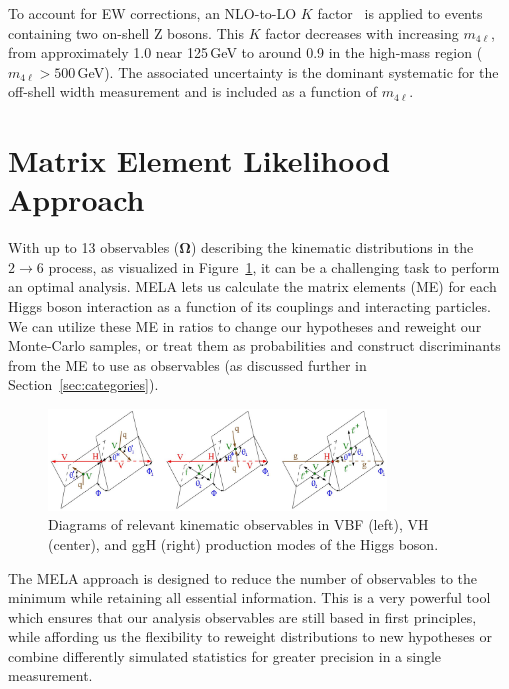 To account for EW corrections, an NLO-to-LO $K$ factor~\cite{Bierweiler:2013dja} is applied to events containing two on-shell Z bosons. This $K$ factor decreases with increasing $m_{4\ell}$, from approximately 1.0 near 125\,GeV to around 0.9 in the high-mass region ($m_{4\ell} > 500$\,GeV). The associated uncertainty is the dominant systematic for the off-shell width measurement and is included as a function of $m_{4\ell}$.


\section{Matrix Element Likelihood Approach}

With up to 13 observables ($\boldsymbol{\Omega}$) describing the \Hboson kinematic distributions in the $2\to 6$ process, as visualized in Figure~\ref{fig:MELA}, it can be a challenging task to perform an optimal analysis. %
MELA lets us calculate the matrix elements (ME) for each Higgs boson interaction as a function of its couplings and interacting particles. We can utilize these ME in ratios to change our hypotheses and reweight our Monte-Carlo samples, or treat them as probabilities and construct discriminants from the ME to use as observables (as discussed further in Section~\ref{sec:categories}). 

\begin{figure}[!htb]
\centering
\includegraphics[width=0.8\textwidth,clip] {figures/MELA.jpg}
\caption{Diagrams of relevant kinematic observables in VBF (left), VH (center), and ggH (right) production modes of the Higgs boson.}
\label{fig:MELA}
\end{figure}

The MELA approach is designed to reduce the number of observables to the minimum while retaining all essential information. This is a very powerful tool which ensures that our analysis observables are still based in first principles, while affording us the flexibility to reweight distributions to new hypotheses or combine differently simulated statistics for greater precision in a single measurement. 

